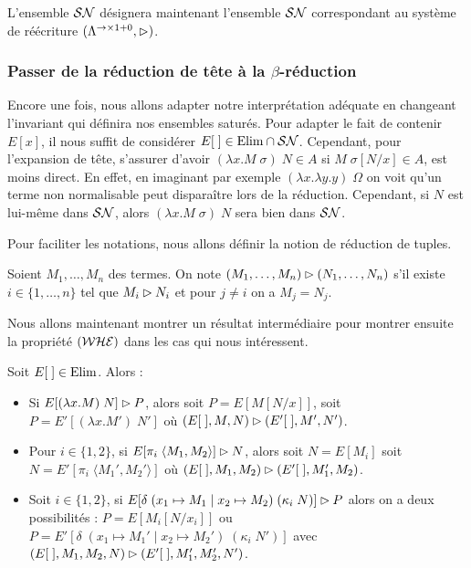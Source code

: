 L'ensemble $\mathcal {SN}$ désignera maintenant l'ensemble $\mathcal {SN}$ correspondant au système de réécriture $(\Lambda^{\to\times1+0},\rhd)$.

\subsubsection{Passer de la réduction de tête à la $\beta$-réduction}

Encore une fois, nous allons adapter notre interprétation adéquate en changeant l'invariant qui définira nos ensembles saturés. Pour adapter le fait de contenir $E[x]$, il nous suffit de considérer $E[\;]\in\mathrm{Elim}\cap\mathcal {SN}$. Cependant, pour l'expansion de tête, s'assurer d'avoir $(\lambda x.M\;\sigma)\;N\in A$ si $M\;\sigma[N/x]\in A$, est moins direct. En effet, en imaginant par exemple $(\lambda x.\lambda y.y)\;\Omega$ on voit qu'un terme non normalisable peut disparaître lors de la réduction. Cependant, si $N$ est lui-même dans $\mathcal {SN}$, alors $(\lambda x.M\;\sigma)\;N$ sera bien dans $\mathcal {SN}$.

Pour faciliter les notations, nous allons définir la notion de réduction de tuples.

\begin{defi}
    Soient $M_1,\ldots,M_n$ des termes. On note $(M_1,\ldots,M_n)\rhd (N_1,\ldots,N_n)$ s'il existe $i\in\{1,\ldots,n\}$ tel que $M_i\rhd N_i$ et pour $j\neq i$ on a $M_j=N_j$.
\end{defi}

Nous allons maintenant montrer un résultat intermédiaire pour montrer ensuite la propriété $(\mathcal {WHE})$ dans les cas qui nous intéressent.

\begin{lem}
    Soit $E[\;]\in\mathrm{Elim}$. Alors :
    \begin{itemize}[label=$\bullet$]
        \item Si $E[(\lambda x.M)\;N]\rhd P$, alors soit $P = E[M[N/x]]$, soit $P = E'[(\lambda x.M')\;N']$ où $(E[\;],M,N)\rhd (E'[\;],M',N')$.
        \item Pour $i\in\{1,2\}$, si $E[\pi_i\;\langle M_1,M_2\rangle]\rhd N$, alors soit $N = E[M_i]$ soit $N = E'[\pi_i\;\langle M_1',M_2'\rangle]$ où $(E[\;],M_1,M_2)\rhd (E'[\;],M_1',M_2)$.
        \item Soit $i\in\{1,2\}$, si $E[\delta\;(x_1\mapsto M_1\mid x_2\mapsto M_2)\;(\kappa_i\;N)]\rhd P$ alors on a deux possibilités : $P = E[M_i[N/x_i]]$ ou $P = E'[\delta\;(x_1\mapsto M_1'\mid x_2\mapsto M_2')\;(\kappa_i\;N')]$ avec $(E[\;],M_1,M_2,N)\rhd (E'[\;],M_1',M_2',N')$.
    \end{itemize}
\end{lem}

